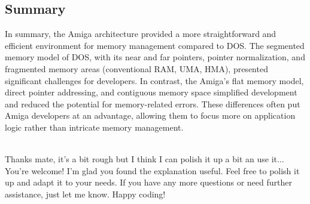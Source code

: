 \documentclass[a4paper]{article}
\begin{document}
\subsection*{Summary}
In summary, the Amiga architecture provided a more straightforward and efficient environment for memory management compared to DOS. The segmented memory model of DOS, with its near and far pointers, pointer normalization, and fragmented memory areas (conventional RAM, UMA, HMA), presented significant challenges for developers. In contrast, the Amiga’s flat memory model, direct pointer addressing, and contiguous memory space simplified development and reduced the potential for memory-related errors. These differences often put Amiga developers at an advantage, allowing them to focus more on application logic rather than intricate memory management.
\begin{dialogue}
 \leavevmode\\
Thanks mate, it's a bit rough but I think I can polish it up a bit an use it...
 \leavevmode\\
You're welcome! I'm glad you found the explanation useful. Feel free to polish it up and adapt it to your needs. If you have any more questions or need further assistance, just let me know. Happy coding!
\end{dialogue}
\end{document}
